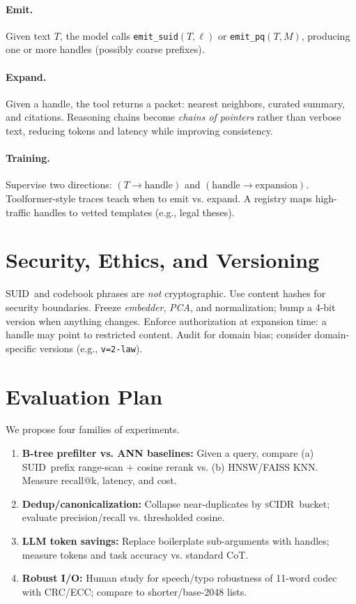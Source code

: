 \documentclass[11pt]{article}
\newcommand{\suid}{\textsc{SUID}}
\newcommand{\scidr}{\textsc{sCIDR}}
\begin{document}
\paragraph{Emit.} Given text $T$, the model calls \texttt{emit\_suid$(T,\ell)$} or \texttt{emit\_pq$(T,M)$}, producing one or more handles (possibly coarse prefixes).

\paragraph{Expand.} Given a handle, the tool returns a packet: nearest neighbors, curated summary, and citations. Reasoning chains become \emph{chains of pointers} rather than verbose text, reducing tokens and latency while improving consistency.

\paragraph{Training.} Supervise two directions: $(T\!\to\!\text{handle})$ and $(\text{handle}\!\to\!\text{expansion})$. Toolformer-style traces teach when to emit vs. expand. A registry maps high-traffic handles to vetted templates (e.g., legal theses).

\section{Security, Ethics, and Versioning}
\suid\ and codebook phrases are \emph{not} cryptographic. Use content hashes for security boundaries. Freeze \emph{embedder}, \emph{PCA}, and normalization; bump a 4-bit version when anything changes. Enforce authorization at expansion time: a handle may point to restricted content. Audit for domain bias; consider domain-specific versions (e.g., \texttt{v=2-law}).

\section{Evaluation Plan}
We propose four families of experiments.
\begin{enumerate}[leftmargin=2em]
  \item \textbf{B-tree prefilter vs. ANN baselines:} Given a query, compare (a) \suid\ prefix range-scan $+$ cosine rerank vs. (b) HNSW/FAISS KNN. Measure recall@k, latency, and cost.
  \item \textbf{Dedup/canonicalization:} Collapse near-duplicates by \scidr\ bucket; evaluate precision/recall vs. thresholded cosine.
  \item \textbf{LLM token savings:} Replace boilerplate sub-arguments with handles; measure tokens and task accuracy vs. standard CoT.
  \item \textbf{Robust I/O:} Human study for speech/typo robustness of 11-word codec with CRC/ECC; compare to shorter/base-2048 lists.
\end{enumerate}
\end{document}
